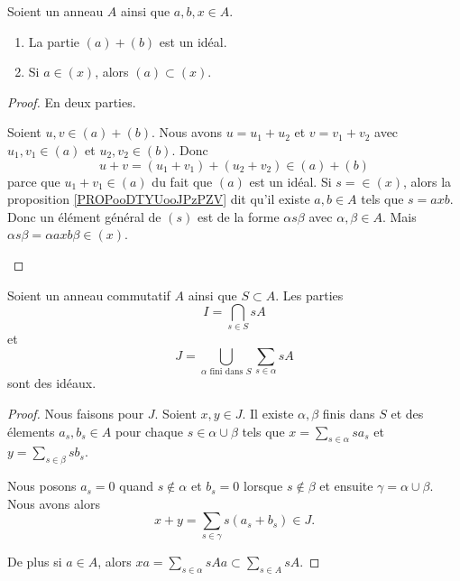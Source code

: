 \begin{proposition}	\label{PROPooFDJXooYbXEpo}
	Soient un anneau \( A\) ainsi que \( a,b,x\in A\).
	\begin{enumerate}
		\item		\label{ITEMooVFXMooPljoHf}
		      La partie \( (a)+(b)\) est un idéal.
		\item	\label{ITEMooMXHAooHPnAdu}
		      Si \( a\in (x)\), alors \( (a)\subset (x)\).
	\end{enumerate}
\end{proposition}

\begin{proof}
	En deux parties.
	\begin{subproof}
		Soient \( u,v\in (a)+(b)\). Nous avons \( u=u_1+u_2\) et \( v=v_1+v_2\) avec \( u_1,v_1\in (a)\) et \( u_2,v_2\in (b)\). Donc
		\begin{equation}
			u+v=(u_1+v_1)+(u_2+v_2)\in (a)+(b)
		\end{equation}
		parce que \( u_1+v_1\in (a)\) du fait que \( (a)\) est un idéal.
		Si \( s=\in (x)\), alors la proposition \ref{PROPooDTYUooJPzPZV} dit qu'il existe \( a,b\in A\) tels que \( s=axb\). Donc un élément général de \( (s)\) est de la forme \( \alpha s\beta\) avec \( \alpha,\beta\in A\). Mais \( \alpha s\beta=\alpha axb\beta\in (x)\).
	\end{subproof}
\end{proof}

\begin{lemma}	\label{LEMooHSVYooRjhGUU}
	Soient un anneau commutatif \( A\) ainsi que \( S\subset A\). Les parties
	\begin{equation}
		I=\bigcap_{s\in S}sA
	\end{equation}
	et
	\begin{equation}
		J=\bigcup_{\alpha\text{ fini dans }S}\sum_{s\in \alpha}sA
	\end{equation}
	sont des idéaux.
\end{lemma}

\begin{proof}
	Nous faisons pour \( J\). Soient \( x,y\in J\). Il existe \( \alpha,\beta\) finis dans \( S\) et des élements \( a_s,b_s\in A\) pour chaque \( s\in \alpha\cup\beta\) tels que \( x=\sum_{s\in \alpha}sa_s\) et \( y=\sum_{s\in\beta}sb_s\).

	Nous posons \( a_s=0\) quand \( s\not\in \alpha\) et \( b_s=0\) lorsque \( s\not\in\beta\) et ensuite \( \gamma=\alpha\cup\beta\). Nous avons alors
	\begin{equation}
		x+y=\sum_{s\in\gamma}s(a_s+b_s)\in J.
	\end{equation}

	De plus si \( a\in A\), alors \( xa=\sum_{s\in\alpha}sAa\subset \sum_{s\in A}sA\).
\end{proof}


